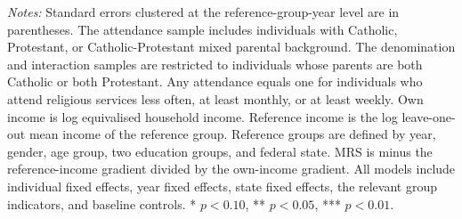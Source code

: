 \begin{table}[!htbp]
\begin{minipage}{1.00\textwidth}
\footnotesize
\emph{Notes:} Standard errors clustered at the reference-group-year level are in parentheses. 
The attendance sample includes individuals with Catholic, Protestant, or Catholic-Protestant mixed parental background. 
The denomination and interaction samples are restricted to individuals whose parents are both Catholic or both Protestant. 
Any attendance equals one for individuals who attend religious services less often, at least monthly, or at least weekly. 
Own income is log equivalised household income. Reference income is the log leave-one-out mean income of the reference group. 
Reference groups are defined by year, gender, age group, two education groups, and federal state. 
MRS is minus the reference-income gradient divided by the own-income gradient. 
All models include individual fixed effects, year fixed effects, state fixed effects, the relevant group indicators, and baseline controls. 
* \(p<0.10\), ** \(p<0.05\), *** \(p<0.01\).
\end{minipage}
\endgroup
\end{table}

